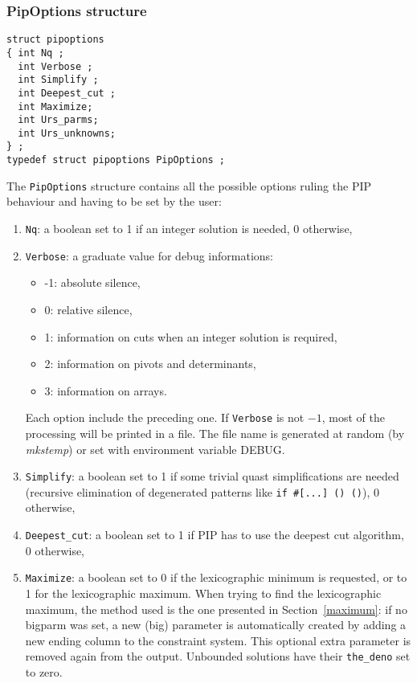 \documentclass[12pt,a4paper,dvips]{article}
\begin{document}
\subsubsection{PipOptions structure}
\begin{verbatim}
struct pipoptions
{ int Nq ;
  int Verbose ;
  int Simplify ;
  int Deepest_cut ;
  int Maximize;
  int Urs_parms;
  int Urs_unknowns;
} ;      
typedef struct pipoptions PipOptions ;
\end{verbatim}
The {\tt PipOptions} structure contains all the possible options ruling
the PIP behaviour and having to be set by the user: 
\begin{enumerate}
\item {\tt Nq}: a boolean set to 1 if an integer solution is needed, 0
      otherwise,
\item {\tt Verbose}: a graduate value for debug informations:
      \begin{itemize}
      \item -1: absolute silence,
      \item 0: relative silence,
      \item 1: information on cuts when an integer solution is required,
      \item 2: information on pivots and determinants,
      \item 3: information on arrays.
      \end{itemize}
      Each option include the preceding one.
      If {\tt Verbose} is not $-1$, most of the processing will be printed in
      a file. The file name is generated at random (by \textit{mkstemp}) or
      set with environment variable DEBUG.
\item {\tt Simplify}: a boolean set to 1 if some trivial quast simplifications
      are needed (recursive elimination of degenerated patterns like
      {\tt if \#[...] () ()}), 0 otherwise,
\item {\tt Deepest\_cut}: a boolean set to 1 if PIP has to use the deepest cut
      algorithm, 0 otherwise,
\item {\tt Maximize}: a boolean set to 0 if the lexicographic
      minimum is requested, or to 1 for the lexicographic maximum. When trying to
      find the lexicographic maximum, the method used is the one
      presented in Section~\ref{maximum}: if no bigparm was set, a new (big)
      parameter is automatically created by adding a new ending column to the
      constraint system.  This optional extra parameter is removed again from the
      output.  Unbounded solutions have their \verb+the_deno+ set to zero.

\end{enumerate}
\end{document}
